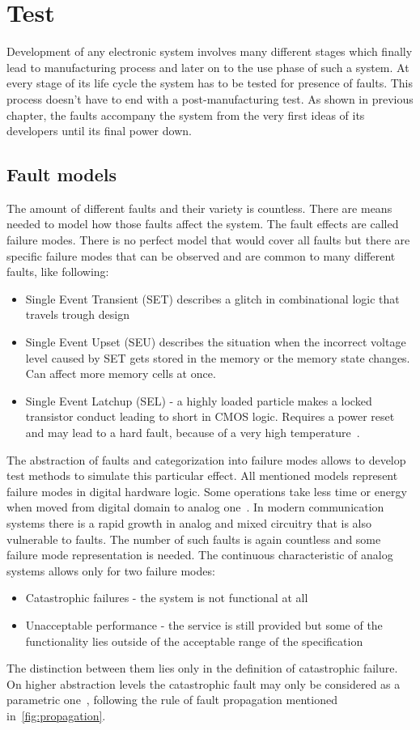 \chapter{Test}
Development of any electronic system involves many different stages which finally lead to manufacturing process and later on to the use phase of such a system. At every stage of its life cycle the system has to be tested for presence of faults. This process doesn't have to end with a post-manufacturing test. As shown in previous chapter, the faults accompany the system from the very first ideas of its developers until its final power down.
\section{Fault models}

The amount of different faults and their variety is countless. There are means needed to model how those faults affect the system. The fault effects are called failure modes. There is no perfect model that would cover all faults but there are specific failure modes that can be observed and are common to many different faults, like following:
\begin{itemize}
    \item Single Event Transient (SET) describes a glitch in combinational logic that travels trough design
    \item Single Event Upset (SEU) describes the situation when the incorrect voltage level caused by SET gets stored in the memory or the memory state changes. Can affect more memory cells at once.
    \item Single Event Latchup (SEL) - a highly loaded particle makes a locked transistor conduct leading to short in CMOS logic. Requires a power reset and may lead to a hard fault, because of a very high temperature~\cite{report:altera}.
\end{itemize}
The abstraction of faults and categorization into failure modes allows to develop test methods to simulate this particular effect. All mentioned models represent failure modes in digital hardware logic. Some operations take less time or energy when moved from digital domain to analog one~\cite{Prof Vierhaus Lectures}. In modern communication systems there is a rapid growth in analog and mixed circuitry that is also vulnerable to faults. The number of such faults is again countless and some failure mode representation is needed. The continuous characteristic of analog systems allows only for two failure modes:
\begin{itemize}
    \item Catastrophic failures - the system is not functional at all
    \item Unacceptable performance - the service is still provided but some of the functionality lies outside of the acceptable range of the specification
\end{itemize}
The distinction between them lies only in the definition of catastrophic failure. On higher abstraction levels the catastrophic fault may only be considered as a parametric one~\cite{book:Kabisatpathy}, following the rule of fault propagation mentioned in~\autoref{fig:propagation}.

